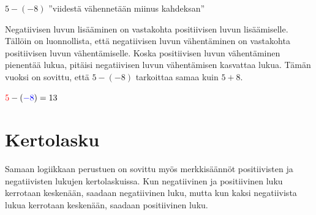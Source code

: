     
    $5-(-8)$ ''viidestä vähennetään miinus kahdeksan''
    
    Negatiivisen luvun lisääminen on vastakohta positiivisen luvun lisäämiselle. Tällöin on luonnollista, että negatiivisen luvun vähentäminen on vastakohta positiivisen luvun vähentämiselle. Koska positiivisen luvun vähentäminen pienentää lukua, pitäisi negatiivisen luvun vähentämisen kasvattaa lukua. Tämän vuoksi on sovittu, että $5-(-8)$ tarkoittaa samaa kuin $5+8$.
    
\vspace{0.3cm}     
        
    \begin{center}
    \begin{lukusuora}{-1}{14}{14}
        {\color{red} }
        \lukusuorauusi
        {\color{red} }
        {\color{blue} }
       \end{lukusuora}
       ${\color{red}5}-({\color{blue}-8})=13$
    \end{center}





\section{Kertolasku}

    Samaan logiikkaan perustuen on sovittu myös merkkisäännöt positiivisten ja negatiivisten lukujen kertolaskuissa. Kun negatiivinen ja positiivinen luku kerrotaan keskenään, saadaan negatiivinen luku, mutta kun kaksi negatiivista lukua kerrotaan keskenään, saadaan positiivinen luku.

